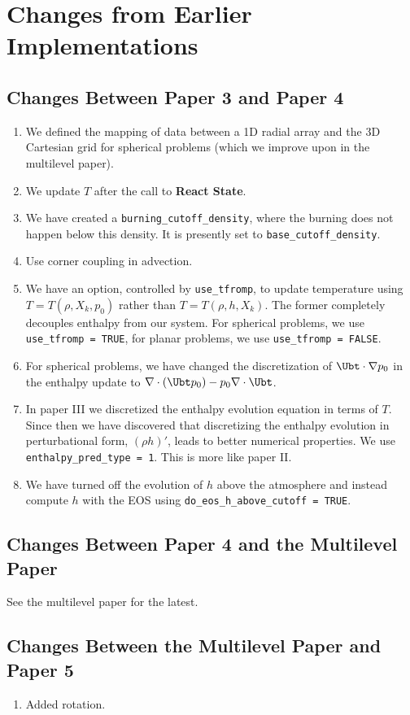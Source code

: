 \section{Changes from Earlier Implementations}
\subsection{Changes Between Paper 3 and Paper 4}
\begin{enumerate}
\item We defined the mapping of data between a 1D radial array and the 3D Cartesian
grid for spherical problems (which we improve upon in the multilevel paper).
\item We update $T$ after the call to {\bf React State}.
\item We have created a {\tt burning\_cutoff\_density}, where the burning does
not happen below this density.  It is presently set to {\tt base\_cutoff\_density}.
\item Use corner coupling in advection.
\item We have an option, controlled by {\tt use\_tfromp}, to update temperature 
using $T=T(\rho,X_k,p_0)$ rather than $T=T(\rho,h,X_k)$.  The former completely 
decouples enthalpy from our system.  For spherical problems, we use 
{\tt use\_tfromp = TRUE}, for planar problems, we use {\tt use\_tfromp = FALSE}.
\item For spherical problems, we have changed the discretization of 
$\Ubt\cdot\nabla p_0$ in the enthalpy update to 
$\nabla\cdot(\Ubt p_0) - p_0\nabla\cdot\Ubt$.
\item In paper III we discretized the enthalpy evolution equation in
terms of $T$.  Since then we have discovered that 
discretizing the enthalpy evolution in perturbational form, $(\rho h)'$,
leads to better numerical properties.  We use {\tt enthalpy\_pred\_type = 1}.
This is more like paper II.
\item We have turned off the evolution of $h$ above the atmosphere and instead
compute $h$ with the EOS using {\tt do\_eos\_h\_above\_cutoff = TRUE}.
\end{enumerate}


\subsection{Changes Between Paper 4 and the Multilevel Paper}
See the multilevel paper for the latest.


\subsection{Changes Between the Multilevel Paper and Paper 5}
\begin{enumerate}
\item Added rotation.
\end{enumerate}


